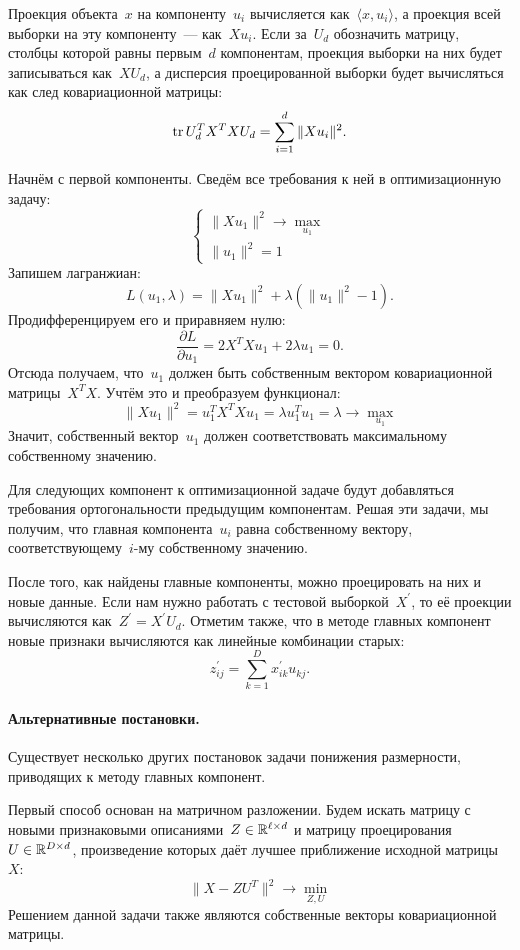 \documentclass[12pt,fleqn]{article}
\begin{document}
Проекция объекта~$x$ на компоненту~$u_i$ вычисляется как~$\langle x, u_i \rangle$,
а проекция всей выборки на эту компоненту~--- как~$X u_i$.
Если за~$U_d$ обозначить матрицу, столбцы которой равны первым~$d$ компонентам,
проекция выборки на них будет записываться как~$X U_d$,
а дисперсия проецированной выборки будет вычисляться как след ковариационной матрицы:
\[
    \mathop{\mathrm{tr}} U_d^T X^T X U_d
    =
    \sum_{i = 1}^{d} \|X u_i\|^2.
\]

Начнём с первой компоненты.
Сведём все требования к ней в оптимизационную задачу:
\[
    \begin{cases}
        \| X u_1 \|^2 \to \max_{u_1} \\
        \|u_1\|^2 = 1
    \end{cases}
\]
Запишем лагранжиан:
\[
    L(u_1, \lambda)
    =
    \| X u_1 \|^2 + \lambda (\|u_1\|^2 - 1).
\]
Продифференцируем его и приравняем нулю:
\[
    \frac{\partial L}{\partial u_1}
    =
    2 X^T Xu_1 + 2 \lambda u_1
    =
    0.
\]
Отсюда получаем, что~$u_1$ должен быть собственным вектором ковариационной матрицы~$X^T X$.
Учтём это и преобразуем функционал:
\[
    \| X u_1 \|^2
    =
    u_1^T X^T X u_1
    =
    \lambda u_1^T u_1
    =
    \lambda
    \to
    \max_{u_1}
\]
Значит, собственный вектор~$u_1$ должен соответствовать максимальному
собственному значению.

Для следующих компонент к оптимизационной задаче будут добавляться требования
ортогональности предыдущим компонентам.
Решая эти задачи, мы получим, что главная компонента~$u_i$
равна собственному вектору, соответствующему~$i$-му собственному значению.

После того, как найдены главные компоненты, можно проецировать на них и новые данные.
Если нам нужно работать с тестовой выборкой~$X^\prime$, то её проекции вычисляются как~$Z^\prime = X^\prime U_d$.
Отметим также, что в методе главных компонент новые признаки вычисляются как линейные комбинации старых:
\[
    z^{\prime}_{ij}
    =
    \sum_{k = 1}^{D}
    x^{\prime}_{ik} u_{kj}.
\]

\paragraph{Альтернативные постановки.}

Существует несколько других постановок задачи понижения размерности,
приводящих к методу главных компонент.

Первый способ основан на матричном разложении.
Будем искать матрицу с новыми признаковыми описаниями~$Z \in \RR^{\ell \times d}$
и матрицу проецирования~$U \in \RR^{D \times d}$,
произведение которых даёт лучшее приближение исходной матрицы~$X$:
\[
    \| X - Z U^T \|^2
    \to
    \min_{Z, U}
\]
Решением данной задачи также являются собственные векторы ковариационной матрицы.
\end{document}

